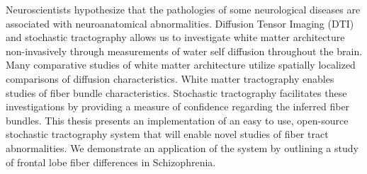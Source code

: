 % 
% 
%
Neuroscientists hypothesize that the pathologies of some neurological diseases are associated with neuroanatomical abnormalities.  Diffusion Tensor Imaging (DTI) and stochastic tractography allows us to investigate white matter architecture non-invasively through measurements of water self diffusion throughout the brain. Many comparative studies of white matter architecture utilize spatially localized comparisons of diffusion characteristics.  White matter tractography enables studies of fiber bundle characteristics.  Stochastic tractography facilitates these investigations by providing a measure of confidence regarding the inferred fiber bundles.  This thesis presents an implementation of an easy to use, open-source stochastic tractography system that will enable novel studies of fiber tract abnormalities.  We demonstrate an application of the system by outlining a study of frontal lobe fiber differences in Schizophrenia.
